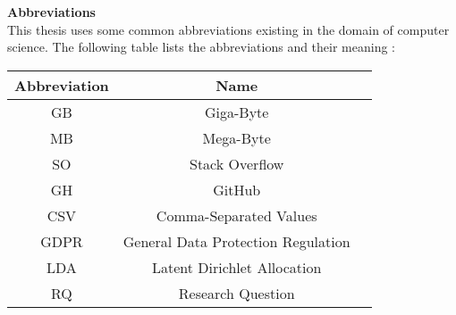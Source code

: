 \begin{center}
{\Large\bf Abbreviations}\\
This thesis uses some common abbreviations existing in the domain of computer science. The following table lists the abbreviations and their meaning :\\ \vspace{12pt}
\begin{tabular}{ccc}
  \hline
  Abbreviation & Name  \\
  \hline\hline
  GB & Giga-Byte \\ 
  MB & Mega-Byte \\
  SO & Stack Overflow \\
  GH & GitHub \\
  CSV & Comma-Separated Values \\
  GDPR & General Data Protection Regulation \\
  LDA & Latent Dirichlet Allocation \\
  RQ & Research Question \\
  \hline
\end{tabular}
\end{center}

